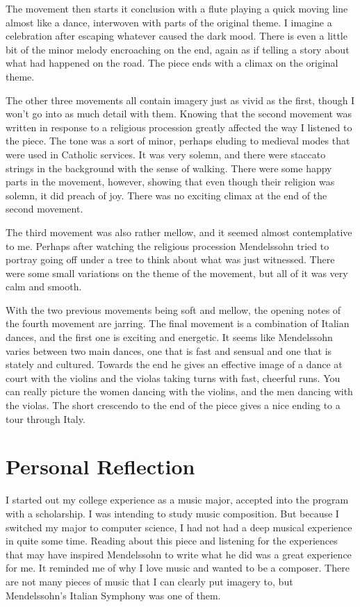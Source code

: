 \documentclass[onecolumn, 12pt]{article}
\begin{document}
The movement then starts it conclusion with a flute playing a quick moving line
almost like a dance, interwoven with parts of the original theme.  I imagine a
celebration after escaping whatever caused the dark mood.  There is even a
little bit of the minor melody encroaching on the end, again as if telling a
story about what had happened on the road.  The piece ends with a climax on
the original theme.

The other three movements all contain imagery just as vivid as the first,
though I won't go into as much detail with them.  Knowing that the second
movement was written in response to a religious procession greatly affected the
way I listened to the piece.  The tone was a sort of minor, perhaps eluding to
medieval modes that were used in Catholic services.  It was very solemn, and
there were staccato strings in the background with the sense of walking.  There
were some happy parts in the movement, however, showing that even though their
religion was solemn, it did preach of joy.  There was no exciting climax at the
end of the second movement.

The third movement was also rather mellow, and it seemed almost contemplative
to me.  Perhaps after watching the religious procession Mendelssohn tried to
portray going off under a tree to think about what was just witnessed.  There
were some small variations on the theme of the movement, but all of it was very
calm and smooth.

With the two previous movements being soft and mellow, the opening notes of the
fourth movement are jarring.  The final movement is a combination of Italian
dances, and the first one is exciting and energetic.  It seems like Mendelssohn
varies between two main dances, one that is fast and sensual and one that is
stately and cultured.  Towards the end he gives an effective image of a dance
at court with the violins and the violas taking turns with fast, cheerful runs.
You can really picture the women dancing with the violins, and the men dancing
with the violas.  The short crescendo to the end of the piece gives a nice
ending to a tour through Italy.

\section*{Personal Reflection}

I started out my college experience as a music major, accepted into the program
with a scholarship.  I was intending to study music composition.  But because I
switched my major to computer science, I had not had a deep musical experience
in quite some time.  Reading about this piece and listening for the experiences
that may have inspired Mendelssohn to write what he did was a great experience
for me.  It reminded me of why I love music and wanted to be a composer.  There
are not many pieces of music that I can clearly put imagery to, but
Mendelssohn's Italian Symphony was one of them.
\end{document}
